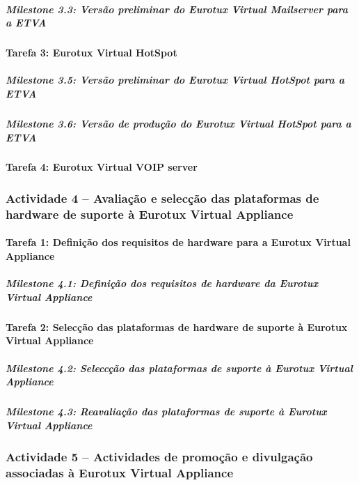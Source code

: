 \documentclass[a4paper,12pt,portugues]{article}
\begin{document}
\subparagraph{Milestone 3.3: Versão preliminar do Eurotux Virtual Mailserver para a ETVA}


\paragraph{Tarefa 3: Eurotux Virtual HotSpot}

\subparagraph{Milestone 3.5: Versão preliminar do Eurotux Virtual HotSpot para a ETVA}

\subparagraph{Milestone 3.6: Versão de produção do Eurotux Virtual HotSpot para a ETVA}


\paragraph{Tarefa 4: Eurotux Virtual VOIP server}


\subsubsection*{Actividade 4 – Avaliação e selecção das plataformas de hardware de suporte à Eurotux Virtual Appliance}

\paragraph{Tarefa 1: Definição dos requisitos de hardware para a Eurotux Virtual Appliance}

\subparagraph{Milestone 4.1: Definição dos requisitos de hardware da Eurotux Virtual Appliance}


\paragraph{Tarefa 2: Selecção das plataformas de hardware de suporte à Eurotux Virtual Appliance}

\subparagraph{Milestone 4.2: Seleccção das plataformas de suporte à Eurotux Virtual Appliance}

\subparagraph{Milestone 4.3: Reavaliação das plataformas de suporte à Eurotux Virtual Appliance}


\subsubsection*{Actividade 5 – Actividades de promoção e divulgação associadas à Eurotux Virtual Appliance}
\end{document}
